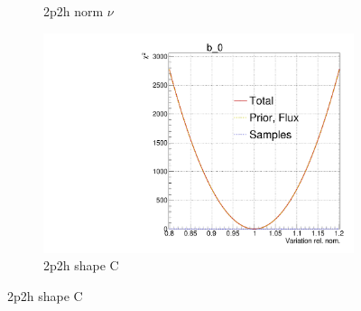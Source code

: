 \begin{figure}[h]
\begin{subfigure}[t]{0.32\textwidth}
		\caption{2p2h norm $\nu$}
	\end{subfigure}
	\begin{subfigure}[t]{0.32\textwidth}
		\includegraphics[width=\textwidth, trim={0mm 0mm 0mm 11mm}, clip,page=113]{figures/mach3/Asimov/Full_LLHscan_18July_BeRPA_U_ND280logL_scan}
		\caption{2p2h shape C}
	\end{subfigure}
	

\end{figure}
